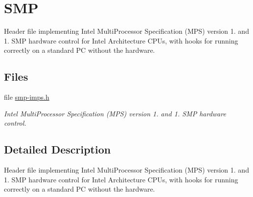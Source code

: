 \hypertarget{group__i386__smp}{}\section{S\+MP}
\label{group__i386__smp}


Header file implementing Intel Multi\+Processor Specification (M\+PS) version 1. and 1. S\+MP hardware control for Intel Architecture C\+P\+Us, with hooks for running correctly on a standard PC without the hardware.  


\subsection*{Files}
\begin{DoxyCompactItemize}
\item 
file \mbox{\hyperlink{smp-imps_8h}{smp-\/imps.\+h}}
\begin{DoxyCompactList}\small\item\em Intel Multi\+Processor Specification (M\+PS) version 1. and 1. S\+MP hardware control. \end{DoxyCompactList}\end{DoxyCompactItemize}


\subsection{Detailed Description}
Header file implementing Intel Multi\+Processor Specification (M\+PS) version 1. and 1. S\+MP hardware control for Intel Architecture C\+P\+Us, with hooks for running correctly on a standard PC without the hardware. 

